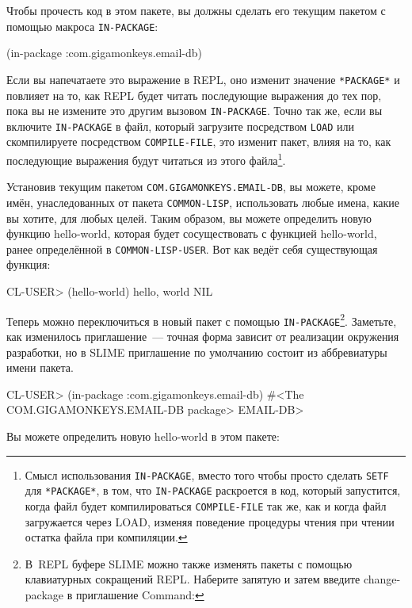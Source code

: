 Чтобы прочесть код в этом пакете, вы должны сделать его текущим пакетом с помощью макроса
\lstinline{IN-PACKAGE}:

\begin{myverb}
(in-package :com.gigamonkeys.email-db)
\end{myverb}

Если вы напечатаете это выражение в REPL, оно изменит значение \lstinline{*PACKAGE*} и повлияет
на то, как REPL будет читать последующие выражения до тех пор, пока вы не измените это
другим вызовом \lstinline{IN-PACKAGE}. Точно так же, если вы включите \lstinline{IN-PACKAGE} в файл,
который загрузите посредством \lstinline{LOAD} или скомпилируете посредством
\lstinline{COMPILE-FILE}, это изменит пакет, влияя на то, как последующие выражения будут
читаться из этого файла\footnote{Смысл использования \lstinline{IN-PACKAGE}, вместо того
  чтобы просто сделать \lstinline{SETF} для \lstinline{*PACKAGE*}, в том, что \lstinline{IN-PACKAGE}
  раскроется в код, который запустится, когда файл будет компилироваться
  \lstinline{COMPILE-FILE} так же, как и когда файл загружается через LOAD, изменяя поведение
  процедуры чтения при чтении остатка файла при компиляции.}.

Установив текущим пакетом \lstinline{COM.GIGAMONKEYS.EMAIL-DB}, вы можете, кроме имён,
унаследованных от пакета \lstinline{COMMON-LISP}, использовать любые имена, какие вы хотите,
для любых целей. Таким образом, вы можете определить новую функцию hello-world, которая
будет сосуществовать с функцией hello-world, ранее определённой в
\lstinline{COMMON-LISP-USER}. Вот как ведёт себя существующая функция:

\begin{myverb}
CL-USER> (hello-world)
hello, world
NIL
\end{myverb}

Теперь можно переключиться в новый пакет с помощью \lstinline{IN-PACKAGE}\footnote{В~REPL
буфере SLIME можно также изменять пакеты с помощью клавиатурных сокращений REPL. Наберите
запятую и затем введите change-package в приглашение Command:}. Заметьте, как изменилось
приглашение~--- точная форма зависит от реализации окружения разработки, но в SLIME
приглашение по умолчанию состоит из аббревиатуры имени пакета.

\begin{myverb}
CL-USER> (in-package :com.gigamonkeys.email-db)
#<The COM.GIGAMONKEYS.EMAIL-DB package>
EMAIL-DB> 
\end{myverb}

Вы можете определить новую hello-world в этом пакете:

